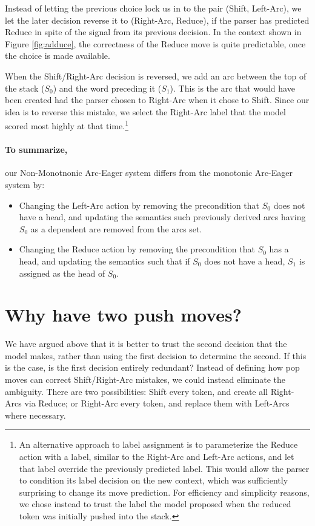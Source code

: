 \documentclass[11pt,letterpaper]{article}
\begin{document}
Instead of letting the previous choice lock us in to the pair (Shift, Left-Arc), we let
the later decision reverse it to (Right-Arc, Reduce), if the parser has predicted
Reduce in spite of the signal from its previous decision.
In the context shown in Figure \ref{fig:adduce}, the correctness of the Reduce
move is quite predictable, once the choice is made available.

When the Shift/Right-Arc decision is reversed, we add an arc between the top
of the stack ($S_0$)
and the word preceding it ($S_1$). This is the arc that would have been created had the parser
chosen to Right-Arc when it chose to Shift. Since our idea is to reverse this mistake,
we select the Right-Arc label that the model scored most highly at that
time.\footnote{An alternative approach to label assignment is to parameterize
the Reduce action with a label, similar to the Right-Arc and Left-Arc actions,
and let that label override the previously predicted label. This would allow the
parser to condition its label decision on the new context, which was sufficiently
surprising to change its move prediction.
For efficiency and simplicity reasons, we chose instead to trust the label the model
proposed when the reduced token was initially pushed into the stack.}

\noindent\paragraph{To summarize,} our Non-Monotnonic Arc-Eager system
differs from the monotonic Arc-Eager system by:
\begin{itemize}
   \item Changing the Left-Arc action by removing the precondition that $S_0$
   does not have a head, and updating the semantics such previously
   derived arcs having $S_0$ as a dependent are removed from the arcs set.

   \item Changing the Reduce action by removing the precondition that $S_0$
   has a head, and updating the semantics such that if $S_0$ does not have
   a head, $S_1$ is assigned as the head of $S_0$.
\end{itemize}


\section{Why have two push moves?}
\label{sec:shiftless}

We have argued above that it is better to trust the second decision that the model
makes, rather than using the first decision to determine the second. If this is
the case, is the first decision entirely redundant?
Instead of defining how pop moves can correct Shift/Right-Arc mistakes, we could
instead eliminate the ambiguity. There are two possibilities:
Shift every token, and create all Right-Arcs via Reduce; or Right-Arc every token,
and replace them with Left-Arcs where necessary.
\end{document}

